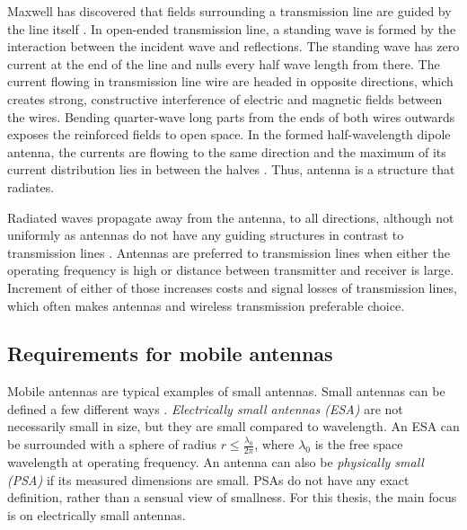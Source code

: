 Maxwell has discovered that fields surrounding a transmission line are guided by the line itself \cite{stutzman}. In open-ended transmission line, a standing wave is formed by the interaction between the incident wave and reflections. The standing wave has zero current at the end of the line and nulls every half wave length from there. The current flowing in transmission line wire are headed in opposite directions, which creates strong, constructive interference of electric and magnetic fields between the wires. Bending quarter-wave long parts from the ends of both wires outwards exposes the reinforced fields to open space. In the formed half-wavelength dipole antenna, the currents are flowing to the same direction and the maximum of its current distribution lies in between the halves \cite{stutzman}. Thus, antenna is a structure that radiates. %

Radiated waves propagate away from the antenna, to all directions, although not uniformly as antennas do not have any guiding structures in contrast to transmission lines \cite{stutzman}. Antennas are preferred to transmission lines when either the operating frequency is high or distance between transmitter and receiver is large. Increment of either of those increases costs and signal losses of transmission lines, which often makes antennas and wireless transmission preferable choice. %


\subsection{Requirements for mobile antennas}
\label{sec:small_antennas}
Mobile antennas are typical examples of small antennas. Small antennas can be defined a few different ways \cite{modern_small_antennas}. \emph{Electrically small antennas (ESA)} are not necessarily small in size, but they are small compared to wavelength. An ESA can be surrounded with a sphere of radius $r\leq\frac{\lambda_0}{2\pi}$, where $\lambda_0$ is the free space wavelength at operating frequency. An antenna can also be \emph{physically small (PSA)} if its measured dimensions are small. PSAs do not have any exact definition, rather than a sensual view of smallness. For this thesis, the main focus is on electrically small antennas.

